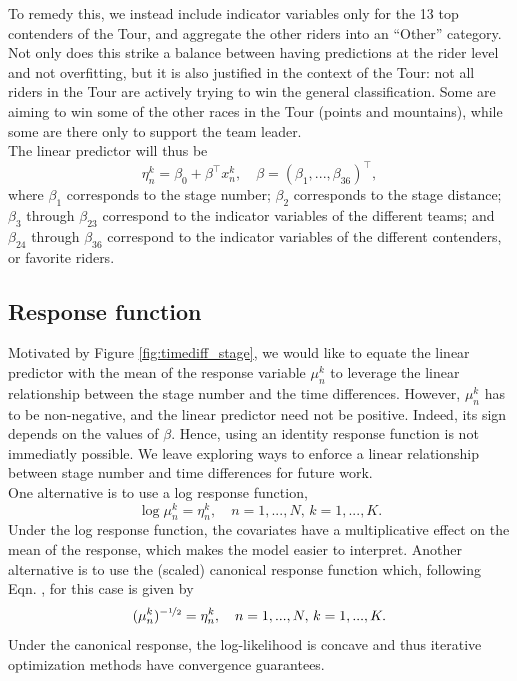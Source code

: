 \documentclass[aos,preprint]{imsart}
\begin{document}
To remedy this, we instead include indicator variables only for the 13 top contenders of the Tour, and aggregate the other riders into an ``Other'' category. Not only does this strike a balance between having predictions at the rider level and not overfitting, but it is also justified in the context of the Tour: not all riders in the Tour are actively trying to win the general classification. Some are aiming to win some of the other races in the Tour (points and mountains), while some are there only to support the team leader. \\

The linear predictor will thus be
\[
  \eta_n^k = \beta_0 + \beta^\top x_n^k, \quad \beta = (\beta_1, ..., \beta_{36})^\top,
\]
where $\beta_1$ corresponds to the stage number; $\beta_2$ corresponds to the stage distance; $\beta_3$ through $\beta_{23}$ correspond to the indicator variables of the different teams; and $\beta_{24}$ through $\beta_{36}$ correspond to the indicator variables of the different contenders, or favorite riders.




\subsection{Response function}



Motivated by Figure \ref{fig:timediff_stage}, we would like to equate the linear predictor with the mean of the response variable $\mu_n^k$ to leverage the linear relationship between the stage number and the time differences. However, $\mu_n^k$ has to be non-negative, and the linear predictor need not be positive. Indeed, its sign depends on the values of $\beta$. Hence, using an identity response function is not immediatly possible. We leave exploring ways to enforce a linear relationship between stage number and time differences for future work. \\

One alternative is to use a log response function,
\[
  \log \mu_n^k = \eta_n^k, \quad n = 1, ..., N, \, k = 1, ..., K. \label{eq:log-response}
\]
Under the log response function, the covariates have a multiplicative effect on the mean of the response, which makes the model easier to interpret. Another alternative is to use the (scaled) canonical response function which, following Eqn. , for this case is given by
\[
  (\mu_n^k)^{-\nicefrac{1}{2}} = \eta_n^k, \quad n = 1, ..., N, \, k = 1, ..., K. \label{eq:canonical-response}
\]
Under the canonical response, the log-likelihood is concave and thus iterative optimization methods have convergence guarantees.
\end{document}
